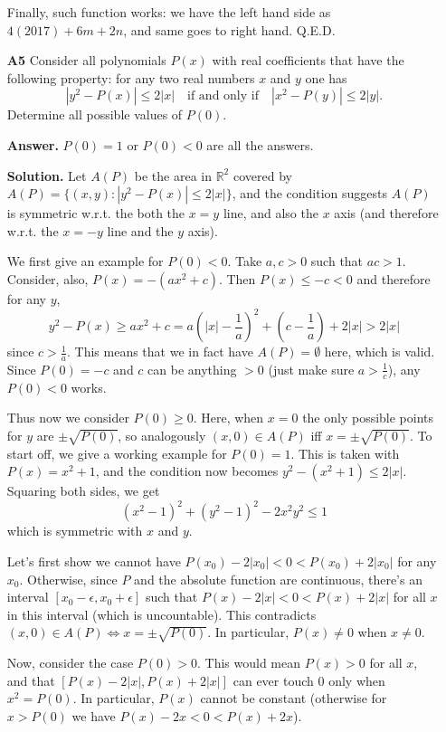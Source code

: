 \documentclass[11pt,a4paper]{article}
\begin{document}
\begin{enumerate}
	Finally, such function works: we have the left hand side as $4(2017)+6m+2n$, and same goes to right hand. Q.E.D. 
	
	\item[\textbf{A5}] 
	Consider all polynomials $P(x)$ with real coefficients that have the following property: for any two real numbers $x$ and $y$ one has\[|y^2-P(x)|\le 2|x|\quad\text{if and only if}\quad |x^2-P(y)|\le 2|y|.\]Determine all possible values of $P(0)$.
	
	\textbf{Answer.} $P(0)=1$ or $P(0) < 0$ are all the answers. 
	
	\textbf{Solution.} 
	Let $A(P)$ be the area in $\mathbb{R}^2$ covered by 
	$A(P) = \{(x, y): |y^2-P(x)|\le 2|x|\}$, and the condition suggests $A(P)$ is symmetric 
	w.r.t. the both the $x=y$ line, and also the $x$ axis (and therefore w.r.t. the $x=-y$ line and the $y$ axis). 
	
	We first give an example for $P(0) < 0$. 
	Take $a, c > 0$ such that $ac > 1$. 
	Consider, also, $P(x)=-(ax^2+c)$. 
	Then $P(x) \le -c < 0$ and therefore for any $y$, 
	\[
	y^2-P(x) \ge ax^2+c = a(|x| - \frac{1}{a})^2 + (c - \frac{1}{a}) + 2|x| > 2|x|
	\]
	since $c > \frac{1}{a}$. 
	This means that we in fact have $A(P)=\emptyset$ here, 
	which is valid. Since $P(0)=-c$ and $c$ can be anything $> 0$ (just make sure $a>\frac{1}{c}$), 
	any $P(0) < 0$ works. 
	
	Thus now we consider $P(0)\ge 0$. 
	Here, when $x=0$ the only possible points for $y$ are $\pm \sqrt{P(0)}$, 
	so analogously $(x, 0)\in A(P)$ iff $x=\pm \sqrt{P(0)}$. 
	To start off, we give a working example for $P(0)=1$. 
	This is taken with $P(x)=x^2+1$, and the condition now becomes 
	$y^2-(x^2+1)\le 2|x|$. Squaring both sides, we get 
	\[
	(x^2-1)^2+(y^2-1)^2-2x^2y^2\le 1
	\]
	which is symmetric with $x$ and $y$. 
	
	Let's first show we cannot have $P(x_0)-2|x_0| < 0 < P(x_0) + 2|x_0|$ for any $x_0$. 
	Otherwise, since $P$ and the absolute function are continuous, 
	there's an interval $[x_0-\epsilon, x_0+\epsilon]$ such that $P(x)-2|x| < 0 < P(x)+2|x|$ 
	for all $x$ in this interval (which is uncountable). 
	This contradicts $(x, 0)\in A(P)\Leftrightarrow x=\pm\sqrt{P(0)}$. 
	In particular, $P(x)\neq 0$ when $x\neq 0$. 
	
	Now, consider the case $P(0) > 0$. This would mean $P(x) > 0$ for all $x$, 
	and that $[P(x)-2|x|, P(x)+2|x|]$ can ever touch 0 only when $x^2=P(0)$. 
	In particular, $P(x)$ cannot be constant (otherwise for $x > P(0)$ we have $P(x) - 2x < 0 < P(x)+2x$). 
	

\end{enumerate}
\end{document}
